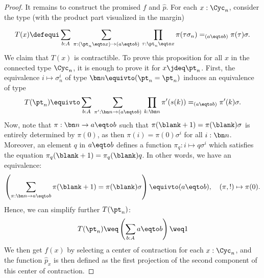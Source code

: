 \begin{proof}
  It remains to construct the promised $f$ and $\hat p$. 
  For each $x:\Cyc_n$, consider the type (with the product
  part visualized in the margin)
  \begin{marginfigure}
\end{marginfigure}
  \begin{displaymath}
    T(x) \defequi \sum_{b:A}\,\sum_{\pi: (\pt_n \eqto x) \to (a \eqto b)}\,
    \prod_{\tau: \pt_n \eqto x} \pi(\tau\sigma_n) =_{(a\eqto b)} \pi(\tau) \sigma.
  \end{displaymath}
  We claim that $T(x)$ is contractible. To prove this proposition for all $x$
  in the connected type $\Cyc_n$, it is enough to prove it for
  $x \jdeq \pt_n$. First, the equivalence $i \mapsto \sigma_n^i$ 
  of type $\bn n \equivto (\pt_n = \pt_n)$ induces an equivalence of type
  \begin{displaymath}
    T(\pt_n) \equivto \sum_{b:A}\,\sum_{\pi': \bn n \to (a \eqto b)}\,
    \prod_{k:\bn n} \pi'(s(k)) =_{(a\eqto b)} \pi'(k)\sigma.
  \end{displaymath}
  Now, note that $\pi:\bn n \to a\eqto b$ such that $\pi(\blank +1) = \pi(\blank)
  \sigma$ is entirely determined by $\pi(0)$, as then $\pi(i) = \pi(0)\sigma^i$
  for all $i:\bn n$. Moreover, an element $q$ in $a\eqto b$ defines a function
  $\pi_q:i \mapsto q\sigma^i$ which satisfies the equation $\pi_q( \blank +1) =
  \pi_q(\blank)q$. In other words, we have an equivalence:
  \begin{displaymath}
    \left( \sum_{\pi:\bn n \to {a\eqto b}} \pi(\blank +1) = \pi(\blank )\sigma \right)
    \equivto
    (a \eqto b), \quad
    (\pi, !) \mapsto \pi(0).
  \end{displaymath}
  Hence, we can simplify further $T(\pt_n)$:
  \begin{displaymath}
    T(\pt_n) \weq \left(\sum_{b:A} a \eqto b\right) \weq 1
  \end{displaymath}
  We then get $f(x)$ by selecting a center of contraction for each $x:\Cyc_n$, and
  the function $\hat p_x$ is then defined as the first projection of the second
  component of this center of contraction.



\end{proof}
